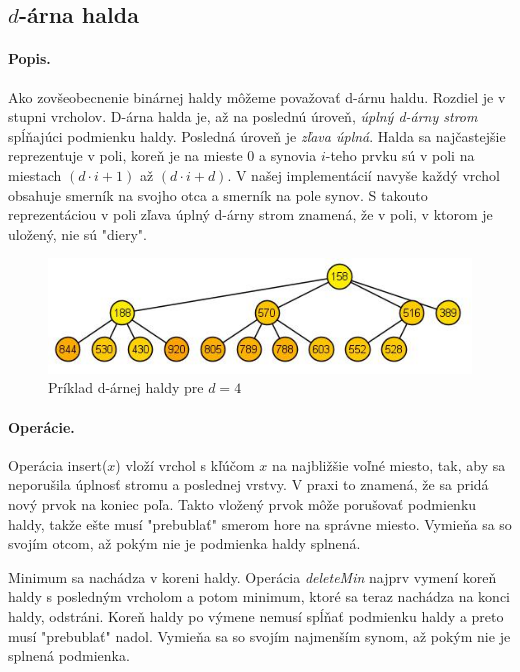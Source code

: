 \subsection{$d$-árna halda} 
\paragraph{Popis.}
Ako zovšeobecnenie binárnej haldy môžeme považovať d-árnu haldu. Rozdiel je v stupni vrcholov. 
D-árna halda je, až na poslednú úroveň, \emph{úplný d-árny strom} spĺňajúci podmienku haldy. Posledná úroveň je 
\emph{zľava úplná}.
Halda sa najčastejšie reprezentuje v poli, koreň je na mieste $0$ a synovia $i$-teho prvku sú v poli na miestach 
$(d\cdot i + 1)$ až $(d\cdot i + d)$. V našej implementácií navyše každý vrchol obsahuje smerník na svojho otca a 
smerník na pole synov.
S takouto reprezentáciou v poli zľava úplný d-árny strom znamená, že v poli, v ktorom je uložený, nie sú "diery". 

\begin{figure}
\includegraphics[width=\columnwidth]{obrazky/daryheap.png}
\caption{\emph{} 
Príklad d-árnej haldy pre $d = 4$} 
\label{img:komp} 
\end{figure}

\paragraph{Operácie.}
Operácia insert($x$) vloží vrchol s kľúčom $x$ na najbližšie voľné miesto, tak, aby sa neporušila úplnosť stromu 
a poslednej vrstvy. V praxi to znamená, že sa pridá nový prvok na koniec poľa. Takto vložený prvok môže porušovať 
podmienku haldy, takže ešte musí "prebublať" smerom hore na správne miesto. Vymieňa sa so svojím otcom, až pokým 
nie je podmienka haldy splnená.

Minimum sa nachádza v koreni haldy. Operácia \emph{deleteMin} najprv vymení koreň haldy s posledným vrcholom a potom 
minimum, ktoré sa teraz nachádza na konci haldy, odstráni. Koreň haldy po výmene nemusí spĺňať podmienku haldy a 
preto musí "prebublať" nadol. Vymieňa sa so svojím najmenším synom, až pokým nie je splnená podmienka.

